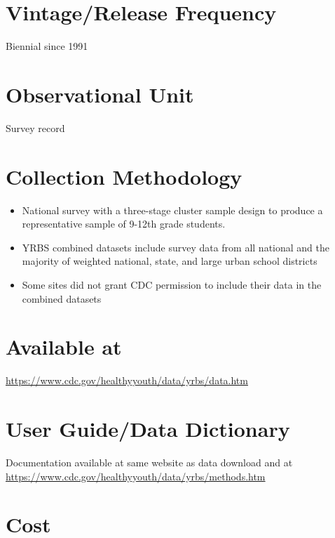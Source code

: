 \documentclass[
]{book}
\providecommand{\tightlist}{%
  \setlength{\itemsep}{0pt}\setlength{\parskip}{0pt}}
\begin{document}
\hypertarget{vintagerelease-frequency-97}{%
\section{Vintage/Release Frequency}\label{vintagerelease-frequency-97}}

Biennial since 1991

\hypertarget{observational-unit-97}{%
\section{Observational Unit}\label{observational-unit-97}}

Survey record

\hypertarget{collection-methodology-97}{%
\section{Collection Methodology}\label{collection-methodology-97}}

\begin{itemize}
\tightlist
\item
  National survey with a three-stage cluster sample design to produce a representative sample of 9-12th grade students.
\item
  YRBS combined datasets include survey data from all national and the majority of weighted national, state, and large urban school districts
\item
  Some sites did not grant CDC permission to include their data in the combined datasets
\end{itemize}

\hypertarget{available-at-97}{%
\section{Available at}\label{available-at-97}}

\url{https://www.cdc.gov/healthyyouth/data/yrbs/data.htm}

\hypertarget{user-guidedata-dictionary-97}{%
\section{User Guide/Data Dictionary}\label{user-guidedata-dictionary-97}}

Documentation available at same website as data download and at \url{https://www.cdc.gov/healthyyouth/data/yrbs/methods.htm}

\hypertarget{cost-97}{%
\section{Cost}\label{cost-97}}
\end{document}
